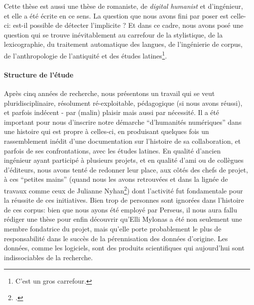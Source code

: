 Cette thèse est aussi une thèse de romaniste, de \textit{digital humanist} et d'ingénieur, et elle a été écrite en ce sens. La question que nous avons fini par poser est celle-ci: est-il possible de détecter l'implicite ? Et dans ce cadre, nous avons posé une question qui se trouve inévitablement au carrefour de la stylistique, de la lexicographie, du traitement automatique des langues, de l'ingénierie de corpus, de l'anthropologie de l'antiquité et des études latines\footnote{C'est un gros carrefour.}.



\paragraph{Structure de l'étude}

Après cinq années de recherche, nous présentons un travail qui se veut pluridisciplinaire, résolument ré-exploitable, pédagogique (si nous avons réussi), et parfois indécent - par (malin) plaisir mais aussi par nécessité. Il a été important pour nous d'inscrire notre démarche \enquote{d'humanités numériques} dans une histoire qui est propre à celles-ci, en produisant quelques fois un rassemblement inédit d'une documentation sur l'histoire de sa collaboration, et parfois de ses confrontations, avec les études latines. En qualité d'ancien ingénieur ayant participé à plusieurs projets, et en qualité d'ami ou de collègues d'éditeurs, nous avons tenté de redonner leur place, aux côtés des chefs de projet, à ces \enquote{petites mains} (quand nous les avons retrouvées et dans la lignée de travaux comme ceux de Julianne Nyhan\footcite{nyhan2017uncovering}) dont l'activité fut fondamentale pour la réussite de ces initiatives. Bien trop de personnes sont ignorées dans l'histoire de ces corpus: bien que nous ayons été employé par Perseus, il nous aura fallu rédiger une thèse pour enfin découvrir qu'Elli Mylonas a été non seulement une membre fondatrice du projet, mais qu'elle porte probablement le plus de responsabilité dans le succès de la pérennisation des données d'origine. Les données, comme les logiciels, sont des produits scientifiques qui aujourd'hui sont indissociables de la recherche.

